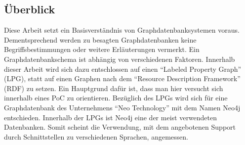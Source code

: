 \subsection{Überblick}
Diese Arbeit setzt ein Basisverständnis von Graphdatenbanksystemen voraus. Dementsprechend werden zu besagten Graphdatenbanken keine Begriffsbestimmungen oder weitere Erläuterungen vermerkt.
\newline
Ein Graphdatenbankschema ist abhängig von verschiedenen Faktoren. Innerhalb dieser Arbeit wird sich dazu entschlossen auf einen \enquote{Labeled Property Graph} (LPG), statt auf einen Graphen nach dem \enquote{Resource Description Framework} (RDF) zu setzen. Ein Hauptgrund dafür ist, dass man hier versucht sich innerhalb eines PoC zu orientieren.
\newline
Bezüglich des LPGs wird sich für eine Graphdatenbank des Unternehmens \enquote{Neo Technology} mit dem Namen Neo4j entschieden. Innerhalb der LPGs ist Neo4j eine der meist verwendeten Datenbanken. Somit scheint die Verwendung, mit dem angebotenen Support durch Schnittstellen zu verschiedenen Sprachen, angemessen.
